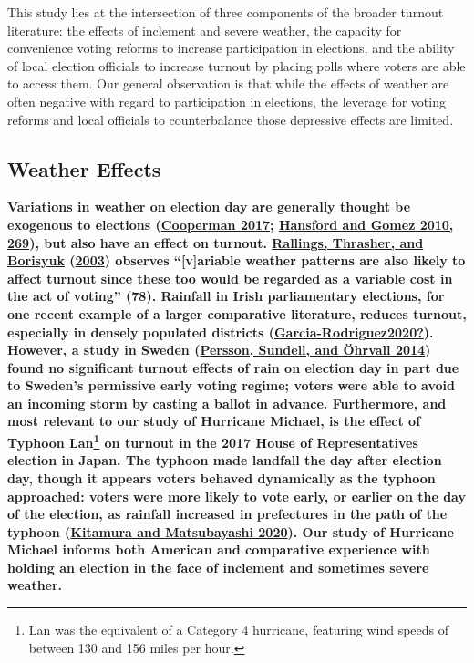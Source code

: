 \documentclass[
  12pt,
]{article}
\begin{document}
This study lies at the intersection of three components of the broader turnout literature: the effects of inclement and severe weather, the capacity for convenience voting reforms to increase participation in elections, and the ability of local election officials to increase turnout by placing polls where voters are able to access them. Our general observation is that while the effects of weather are often negative with regard to participation in elections, the leverage for voting reforms and local officials to counterbalance those depressive effects are limited.

\hypertarget{weather-effects}{%
\subsection*{Weather Effects}\label{weather-effects}}

\textbf{Variations in weather on election day are generally thought be exogenous to elections (\protect\hyperlink{ref-Cooperman2017}{Cooperman 2017}; \protect\hyperlink{ref-Hansford2010}{Hansford and Gomez 2010, 269}), but also have an effect on turnout. \protect\hyperlink{ref-Rallings2003}{Rallings, Thrasher, and Borisyuk} (\protect\hyperlink{ref-Rallings2003}{2003}) observes ``{[}v{]}ariable weather patterns are also likely to affect turnout since these too would be regarded as a variable cost in the act of voting'' (78). Rainfall in Irish parliamentary elections, for one recent example of a larger comparative literature, reduces turnout, especially in densely populated districts (\protect\hyperlink{ref-Garcia-Rodriguez2020}{\textbf{Garcia-Rodriguez2020?}}). However, a study in Sweden (\protect\hyperlink{ref-Persson2014}{Persson, Sundell, and Öhrvall 2014}) found no significant turnout effects of rain on election day in part due to Sweden's permissive early voting regime; voters were able to avoid an incoming storm by casting a ballot in advance. Furthermore, and most relevant to our study of Hurricane Michael, is the effect of Typhoon Lan\footnote{Lan was the equivalent of a Category 4 hurricane, featuring wind speeds of between 130 and 156 miles per hour.} on turnout in the 2017 House of Representatives election in Japan. The typhoon made landfall the day after election day, though it appears voters behaved dynamically as the typhoon approached: voters were more likely to vote early, or earlier on the day of the election, as rainfall increased in prefectures in the path of the typhoon (\protect\hyperlink{ref-Kitamura2020}{Kitamura and Matsubayashi 2020}). Our study of Hurricane Michael informs both American and comparative experience with holding an election in the face of inclement and sometimes severe weather.}
\end{document}
